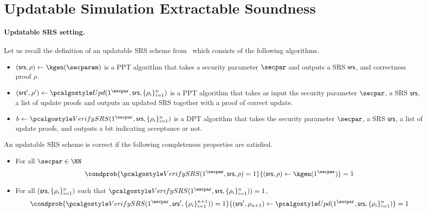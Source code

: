 

\section{Updatable Simulation Extractable Soundness}

\paragraph{Updatable SRS setting.} Let us recall the definition of an updatable SRS scheme from~\cite{C:GKMMM18} which consists of the following algorithms.

\begin{itemize}
	\item
	$(\srs,\rho) \leftarrow \kgen(\secparam)$ is a PPT algorithm that takes a security parameter $\secpar$ and outputs a SRS $\mathsf{srs}$, and correctness proof $\rho$.
	\item
	$ (\srs',\rho') \leftarrow \upd(1^\secpar,\srs,\{\rho_i \}_{i=1}^n)$ is a PPT algorithm that takes as input the security parameter $\secpar$, a SRS $\mathsf{srs}$, a list of update proofs and outputs an updated SRS together with a proof of correct update. 
	\item
	$b \leftarrow \verifyCRS(1^\secpar,\srs,\{\rho_i \}_{i=1}^n)$ is a DPT algorithm that takes the security parameter $\secpar$, a SRS $\mathsf{srs}$, a list of update proofs, and outputs a bit indicating acceptance or not. 
\end{itemize}

\begin{definition}
	An updatable SRS scheme is correct if the following completeness properties are satisfied.
	
	\begin{itemize}
		
		\item
		For all $\secpar \in \NN$
		\[
		\condprob{\verifyCRS(1^\secpar,\srs,\rho) = 1}{(\srs,\rho) \leftarrow \kgen(1^\secpar)} = 1
		\]
		\item
		
		For all $(\mathsf{srs},\{\rho_i \}_{i=1}^n)$ such that $\verifyCRS(1^\secpar,\srs,\{\rho_i \}_{i=1}^n))=1$,
		\[
		\condprob{\verifyCRS(1^\secpar,\srs',\{\rho_i \}_{i=1}^{n+1}))=1}{(\srs',\rho_{n+1}) \leftarrow \upd(1^\secpar,\srs,\{\rho_i \}_{i=1}^n)} = 1
		\]
		
	\end{itemize}
\end{definition} 


